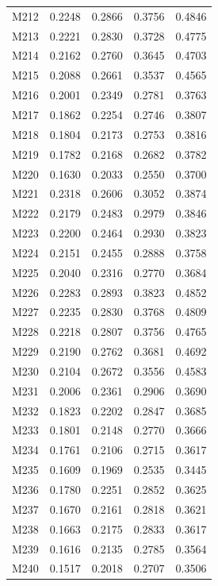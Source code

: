 \begin{longtable}{lrrrr}
M212 & 0.2248 & 0.2866 & 0.3756 & 0.4846 \\
M213 & 0.2221 & 0.2830 & 0.3728 & 0.4775 \\
M214 & 0.2162 & 0.2760 & 0.3645 & 0.4703 \\
M215 & 0.2088 & 0.2661 & 0.3537 & 0.4565 \\
M216 & 0.2001 & 0.2349 & 0.2781 & 0.3763 \\
M217 & 0.1862 & 0.2254 & 0.2746 & 0.3807 \\
M218 & 0.1804 & 0.2173 & 0.2753 & 0.3816 \\
M219 & 0.1782 & 0.2168 & 0.2682 & 0.3782 \\
M220 & 0.1630 & 0.2033 & 0.2550 & 0.3700 \\
M221 & 0.2318 & 0.2606 & 0.3052 & 0.3874 \\
M222 & 0.2179 & 0.2483 & 0.2979 & 0.3846 \\
M223 & 0.2200 & 0.2464 & 0.2930 & 0.3823 \\
M224 & 0.2151 & 0.2455 & 0.2888 & 0.3758 \\
M225 & 0.2040 & 0.2316 & 0.2770 & 0.3684 \\
M226 & 0.2283 & 0.2893 & 0.3823 & 0.4852 \\
M227 & 0.2235 & 0.2830 & 0.3768 & 0.4809 \\
M228 & 0.2218 & 0.2807 & 0.3756 & 0.4765 \\
M229 & 0.2190 & 0.2762 & 0.3681 & 0.4692 \\
M230 & 0.2104 & 0.2672 & 0.3556 & 0.4583 \\
M231 & 0.2006 & 0.2361 & 0.2906 & 0.3690 \\
M232 & 0.1823 & 0.2202 & 0.2847 & 0.3685 \\
M233 & 0.1801 & 0.2148 & 0.2770 & 0.3666 \\
M234 & 0.1761 & 0.2106 & 0.2715 & 0.3617 \\
M235 & 0.1609 & 0.1969 & 0.2535 & 0.3445 \\
M236 & 0.1780 & 0.2251 & 0.2852 & 0.3625 \\
M237 & 0.1670 & 0.2161 & 0.2818 & 0.3621 \\
M238 & 0.1663 & 0.2175 & 0.2833 & 0.3617 \\
M239 & 0.1616 & 0.2135 & 0.2785 & 0.3564 \\
M240 & 0.1517 & 0.2018 & 0.2707 & 0.3506 \\
\end{longtable}

